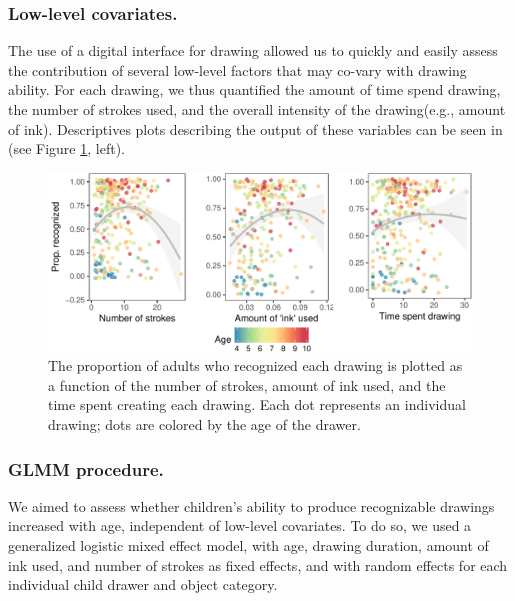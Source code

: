 \documentclass[10pt, letterpaper]{article}
\newenvironment{CodeChunk}{}{}
\begin{document}
\subsubsection{Low-level covariates.}\label{low-level-covariates.}

The use of a digital interface for drawing allowed us to quickly and
easily assess the contribution of several low-level factors that may
co-vary with drawing ability. For each drawing, we thus quantified the
amount of time spend drawing, the number of strokes used, and the
overall intensity of the drawing(e.g., amount of ink). Descriptives
plots describing the output of these variables can be seen in (see
Figure \ref{fig:covDescriptives}, left).

\begin{CodeChunk}
\begin{figure}[h]

{\centering \includegraphics{figs/covDescriptives-1} 

}

\caption[The proportion of adults who recognized each drawing is plotted as a function of the number of strokes, amount of ink used, and the time spent creating each drawing]{The proportion of adults who recognized each drawing is plotted as a function of the number of strokes, amount of ink used, and the time spent creating each drawing. Each dot represents an individual drawing; dots are colored by the age of the drawer.}\label{fig:covDescriptives}
\end{figure}
\end{CodeChunk}

\subsubsection{GLMM procedure.}\label{glmm-procedure.}

We aimed to assess whether children's ability to produce recognizable
drawings increased with age, independent of low-level covariates. To do
so, we used a generalized logistic mixed effect model, with age, drawing
duration, amount of ink used, and number of strokes as fixed effects,
and with random effects for each individual child drawer and object
category.
\end{document}
